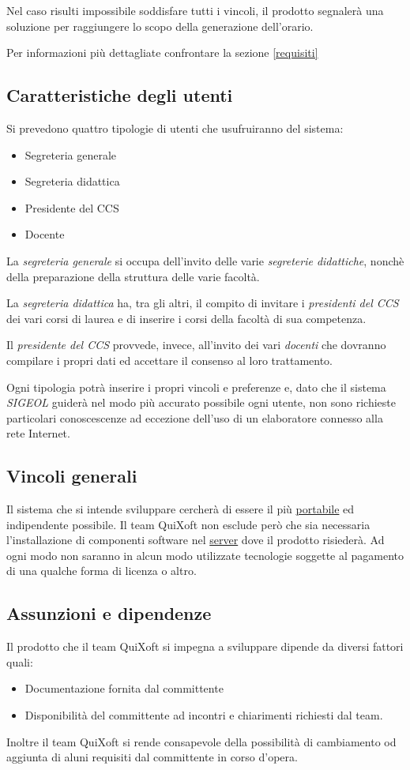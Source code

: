 \documentclass[11pt,a4paper]{article}
\begin{document}
Nel caso risulti impossibile soddisfare tutti i vincoli, il prodotto segnalerà una soluzione per raggiungere lo scopo della generazione dell'orario.

Per informazioni più dettagliate confrontare la sezione \ref{requisiti}
\subsection{Caratteristiche degli utenti} \label{utenti}
Si prevedono quattro tipologie di utenti che usufruiranno del sistema:
\begin{itemize}
 \item Segreteria generale
 \item Segreteria didattica
 \item Presidente del CCS
 \item Docente
\end{itemize}

La \textit{segreteria generale} si occupa dell'invito delle varie \textit{segreterie didattiche}, nonchè della preparazione della struttura delle varie facoltà.

La \textit{segreteria didattica} ha, tra gli altri, il compito di invitare i \textit{presidenti del CCS} dei vari corsi di laurea e di inserire i corsi della facoltà di sua competenza.

Il \textit{presidente del CCS} provvede, invece, all'invito dei vari \textit{docenti} che dovranno compilare i propri dati ed accettare il consenso al loro trattamento.

Ogni tipologia potrà inserire i propri vincoli e preferenze e, dato che il sistema \textit{SIGEOL} guiderà nel modo più accurato possibile ogni utente, non sono richieste particolari conoscescenze ad eccezione dell'uso di un elaboratore connesso alla rete Internet.
\subsection{Vincoli generali}
Il sistema che si intende sviluppare cercherà di essere il più \underline{portabile} ed indipendente possibile. Il team QuiXoft non esclude però che sia necessaria l'installazione di componenti software nel \underline{server} dove il prodotto risiederà. Ad ogni modo non saranno in alcun modo utilizzate tecnologie soggette al pagamento di una qualche forma di licenza o altro.
\subsection{Assunzioni e dipendenze}
Il prodotto che il team QuiXoft si impegna a sviluppare dipende da diversi fattori quali:
\begin{itemize}
 \item Documentazione fornita dal committente
 \item Disponibilità del committente ad incontri e chiarimenti richiesti dal team.
\end{itemize}
Inoltre il team QuiXoft si rende consapevole della possibilità di cambiamento od aggiunta di aluni requisiti dal committente in corso d'opera.
\end{document}
